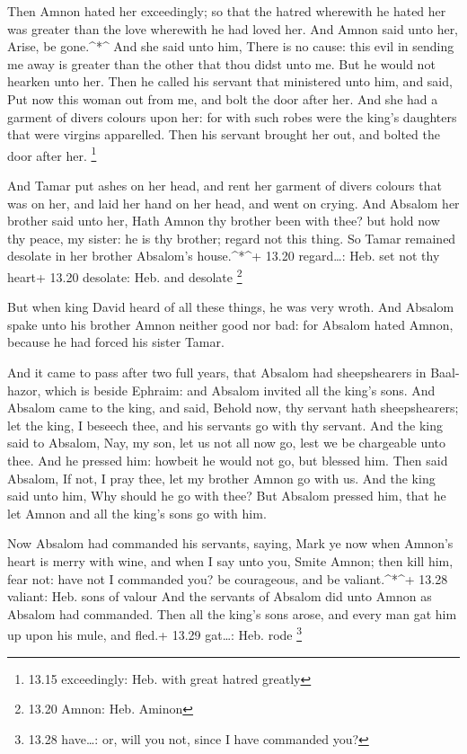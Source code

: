  Then Amnon hated her exceedingly; so that the hatred
wherewith he hated her was greater than the love wherewith he had loved
her. And Amnon said unto her, Arise, be gone.\^{}*\^{}  And
she said unto him, There is no cause: this evil in sending me away is
greater than the other that thou didst unto me. But he would not hearken
unto her.  Then he called his servant that ministered unto
him, and said, Put now this woman out from me, and bolt the door after
her.  And she had a garment of divers colours upon her: for
with such robes were the king's daughters that were virgins apparelled.
Then his servant brought her out, and bolted the door after her.
\footnote{13.15 exceedingly: Heb. with great hatred greatly}

 And Tamar put ashes on her head, and rent her garment of
divers colours that was on her, and laid her hand on her head, and went
on crying.  And Absalom her brother said unto her, Hath
Amnon thy brother been with thee? but hold now thy peace, my sister: he
is thy brother; regard not this thing. So Tamar remained desolate in her
brother Absalom's house.\^{}*\^{}+ 13.20 regard\ldots: Heb. set not thy
heart+ 13.20 desolate: Heb. and desolate \footnote{13.20 Amnon: Heb.
  Aminon}

 But when king David heard of all these things, he was very
wroth.  And Absalom spake unto his brother Amnon neither
good nor bad: for Absalom hated Amnon, because he had forced his sister
Tamar.

 And it came to pass after two full years, that Absalom had
sheepshearers in Baal-hazor, which is beside Ephraim: and Absalom
invited all the king's sons.  And Absalom came to the king,
and said, Behold now, thy servant hath sheepshearers; let the king, I
beseech thee, and his servants go with thy servant.  And
the king said to Absalom, Nay, my son, let us not all now go, lest we be
chargeable unto thee. And he pressed him: howbeit he would not go, but
blessed him.  Then said Absalom, If not, I pray thee, let
my brother Amnon go with us. And the king said unto him, Why should he
go with thee?  But Absalom pressed him, that he let Amnon
and all the king's sons go with him.

 Now Absalom had commanded his servants, saying, Mark ye
now when Amnon's heart is merry with wine, and when I say unto you,
Smite Amnon; then kill him, fear not: have not I commanded you? be
courageous, and be valiant.\^{}*\^{}+ 13.28 valiant: Heb. sons of valour
 And the servants of Absalom did unto Amnon as Absalom had
commanded. Then all the king's sons arose, and every man gat him up upon
his mule, and fled.+ 13.29 gat\ldots: Heb. rode \footnote{13.28
  have\ldots: or, will you not, since I have commanded you?}

